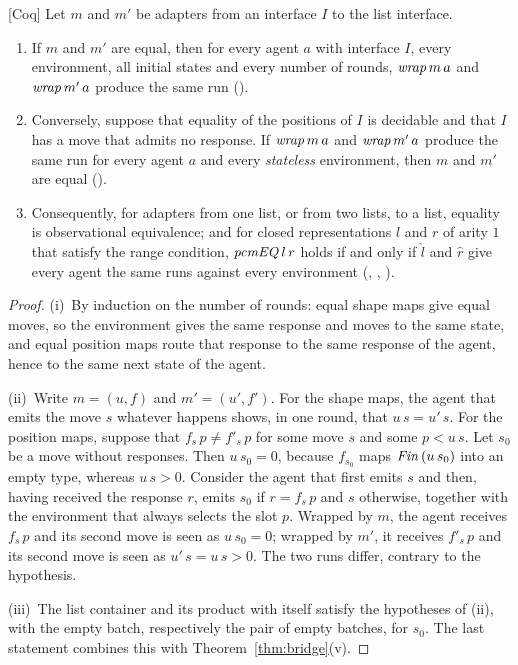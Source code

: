 \documentclass{fundam}
\begin{document}
\begin{theorem}\label{thm:fullabs}
  \textsf{[Coq]}  Let $m$ and $m'$ be adapters from an interface $I$ to the list
  interface.
  \begin{enumerate}[label=(\roman*),leftmargin=2em]
  \item If $m$ and $m'$ are equal, then for every agent $a$ with interface $I$, every
    environment, all initial states and every number of rounds, $\mathit{wrap}\,m\,a$ and
    $\mathit{wrap}\,m'\,a$ produce the same run ().
  \item Conversely, suppose that equality of the positions of $I$ is decidable and that
    $I$ has a move that admits no response.  If $\mathit{wrap}\,m\,a$ and
    $\mathit{wrap}\,m'\,a$ produce the same run for every agent $a$ and every
    \emph{stateless} environment, then $m$ and $m'$ are equal ().
  \item Consequently, for adapters from one list, or from two lists, to a list, equality
    is observational equivalence; and for closed representations $l$ and $r$ of arity $1$
    that satisfy the range condition, $\mathit{pcmEQ}\,l\,r$ holds if and only if
    $\widehat{l}$ and $\widehat{r}$ give every agent the same runs against every
    environment (, ,
    ).
  \end{enumerate}
\end{theorem}

\begin{proof}
  (i)~By induction on the number of rounds: equal shape maps give equal moves, so the
  environment gives the same response and moves to the same state, and equal position
  maps route that response to the same response of the agent, hence to the same next
  state of the agent.

  (ii)~Write $m = (u, f)$ and $m' = (u', f')$.  For the shape maps, the agent that emits
  the move $s$ whatever happens shows, in one round, that $u\,s = u'\,s$.  For the
  position maps, suppose that $f_s\,p \neq f'_s\,p$ for some move $s$ and some
  $p < u\,s$.  Let $s_0$ be a move without responses.  Then $u\,s_0 = 0$, because
  $f_{s_0}$ maps $\mathit{Fin}\,(u\,s_0)$ into an empty type, whereas $u\,s > 0$.  Consider the
  agent that first emits $s$ and then, having received the response $r$, emits $s_0$ if
  $r = f_s\,p$ and $s$ otherwise, together with the environment that always selects the
  slot $p$.  Wrapped by $m$, the agent receives $f_s\,p$ and its second move is seen as
  $u\,s_0 = 0$; wrapped by $m'$, it receives $f'_s\,p$ and its second move is seen as
  $u'\,s = u\,s > 0$.  The two runs differ, contrary to the hypothesis.

  (iii)~The list container and its product with itself satisfy the hypotheses of (ii),
  with the empty batch, respectively the pair of empty batches, for $s_0$.  The last
  statement combines this with Theorem~\ref{thm:bridge}(v).
\end{proof}
\end{document}
